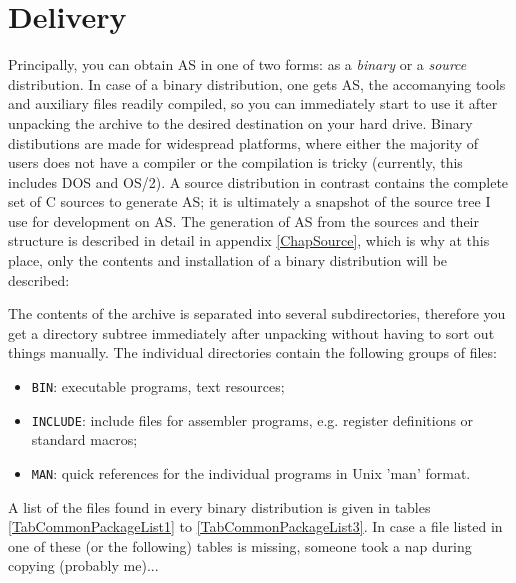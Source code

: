 \documentclass[12pt,twoside]{report}
\begin{document}

\section{Delivery}

Principally, you can obtain AS in one of two forms: as a {\em binary} or a
{\em source} distribution.  In case of a binary distribution, one gets AS,
the accomanying tools and auxiliary files readily compiled, so you can
immediately start to use it after unpacking the archive to the desired
destination on your hard drive.
Binary distibutions are made for widespread platforms, where either the
majority of users does not have a compiler or the compilation is tricky
(currently, this includes DOS and OS/2).  A source distribution in
contrast contains the complete set of C sources to generate AS; it is
ultimately a snapshot of the source tree I use for development on AS.  The
generation of AS from the sources and their structure is described in
detail in appendix \ref{ChapSource}, which is why at this place, only the
contents and installation of a binary distribution will be described:

The contents of the archive is separated into several subdirectories,
therefore you get a directory subtree immediately after unpacking without
having to sort out things manually.  The individual directories contain
the following groups of files:
\begin{itemize}
\item{{\tt BIN}: executable programs, text resources;}
\item{{\tt INCLUDE}: include files for assembler programs, e.g. register
      definitions or standard macros;}
\item{{\tt MAN}: quick references for the individual programs in Unix
      'man' format.}
\end{itemize}
A list of the files found in every binary distribution is given in tables
\ref{TabCommonPackageList1} to \ref{TabCommonPackageList3}.  In case a
file listed in one of these (or the following) tables is missing, someone
took a nap during copying (probably me)...
\end{document}
